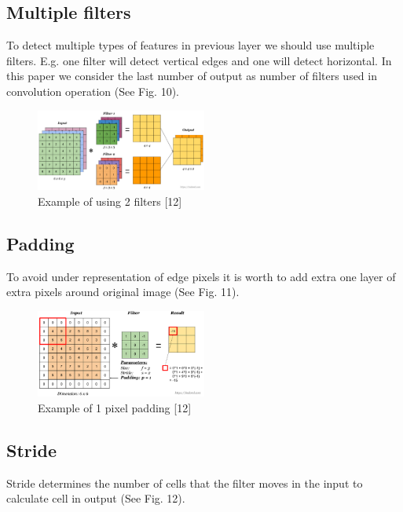 \documentclass[letterpaper, 10 pt, conference]{ieeeconf}  %
\begin{document}
% 

\subsection{Multiple filters}

To detect multiple types of features in previous layer we should use multiple filters. E.g. one filter will detect vertical edges and one will detect horizontal. In this paper we consider the last number of output as number of filters used in convolution operation (See Fig. 10).

\begin{figure}[!ht]
	\centering
    \includegraphics[width=0.5\textwidth]{Pictures/convolution-with-multiple-filters2.png}
	\caption{Example of using 2 filters [12]}
\end{figure}

\subsection{Padding}

To avoid under representation of edge pixels it is worth to add extra one layer of extra pixels around original image (See Fig. 11).

\begin{figure}[!ht]
	\centering
    \includegraphics[width=0.5\textwidth]{Pictures/padding.png}
	\caption{Example of 1 pixel padding [12]}
\end{figure}

\subsection{Stride}

Stride determines the number of cells that the filter moves in the input to calculate cell in output (See Fig. 12).
\end{document}

